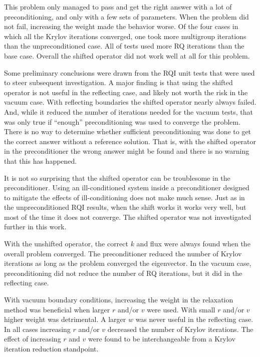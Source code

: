 This problem only managed to pass and get the right answer with a lot of preconditioning, and only with a few sets of parameters. When the problem did not fail, increasing the weight made the behavior worse. Of the four cases in which all the Krylov iterations converged, one took more multigroup iterations than the unpreconditioned case. All of tests used more RQ iterations than the base case. Overall the shifted operator did not work well at all for this problem.

Some preliminary conclusions were drawn from the RQI unit tests that were used to steer subsequent investigation. A major finding is that using the shifted operator is not useful in the reflecting case, and likely not worth the risk in the vacuum case. With reflecting boundaries the shifted operator nearly always failed. And, while it reduced the number of iterations needed for the vacuum tests, that was only true if ``enough'' preconditioning was used to converge the problem. There is no way to determine whether sufficient preconditioning was done to get the correct answer without a reference solution. That is, with the shifted operator in the preconditioner the wrong answer might be found and there is no warning that this has happened. 

It is not so surprising that the shifted operator can be troublesome in the preconditioner. Using an ill-conditioned system inside a preconditioner designed to mitigate the effects of ill-conditioning does not make much sense. Just as in the unpreconditioned RQI results, when the shift works it works very well, but most of the time it does not converge. The shifted operator was not investigated further in this work.

With the unshifted operator, the correct $k$ and flux were always found when the overall problem converged. The preconditioner reduced the number of Krylov iterations as long as the problem converged the eigenvector. In the vacuum case, preconditioning did not reduce the number of RQ iterations, but it did in the reflecting case. 

With vacuum boundary conditions, increasing the weight in the relaxation method was beneficial when larger $r$ and/or $v$ were used. With small $r$ and/or $v$ higher weight was detrimental. A larger $w$ was never useful in the reflecting case. In all cases increasing $r$ and/or $v$ decreased the number of Krylov iterations. The effect of increasing $r$ and $v$ were found to be interchangeable from a Krylov iteration reduction standpoint. 

